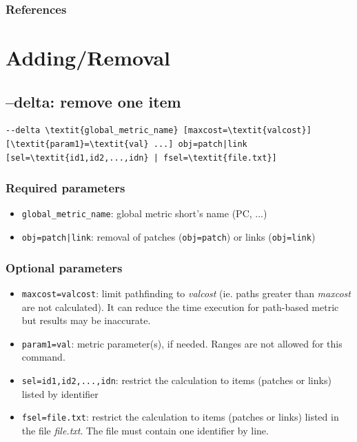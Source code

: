 \documentclass[a4paper,10pt]{report}
\begin{document}
\subsubsection{References}
\cite{2012_SDM, 2012_graphab_EMS, 2013_SDM, 2013_SDM_rainette}

\section{Adding/Removal}
\subsection{--delta: remove one item}
\begin{Verbatim}[commandchars=\\\{\}]
--delta \textit{global_metric_name} [maxcost=\textit{valcost}] [\textit{param1}=\textit{val} ...] obj=patch|link
[sel=\textit{id1,id2,...,idn} | fsel=\textit{file.txt}]
\end{Verbatim}

\subsubsection{Required parameters}
\begin{itemize}
	\item \verb|global_metric_name|: global metric short's name (PC, ...)
	\item \verb+obj=patch|link+: removal of patches (\verb+obj=patch+) or links (\verb+obj=link+)
\end{itemize}

\subsubsection{Optional parameters}
\begin{itemize}
	\item \verb|maxcost=valcost|: limit pathfinding to \textit{valcost} (ie. paths greater than \textit{maxcost} are not calculated). It can reduce the time execution for path-based metric but results may be inaccurate.
	\item \verb|param1=val|: metric parameter(s), if needed. Ranges are not allowed for this command.
	\item \verb|sel=id1,id2,...,idn|: restrict the calculation to items (patches or links) listed by identifier
	\item \verb|fsel=file.txt|: restrict the calculation to items (patches or links) listed in the file \textit{file.txt}. The file must contain one identifier by line.
\end{itemize}
\end{document}
